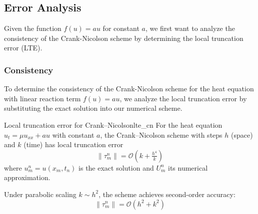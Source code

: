 
\subsection{Error Analysis}
Given the function \(f(u) = au\) for constant \(a\), we first want to analyze the consistency of the Crank-Nicolson scheme by determining the local truncation error (LTE).

\subsubsection{Consistency}
To determine the consistency of the Crank-Nicolson scheme for the heat equation with linear reaction term $f(u) = au$, we analyze the local truncation error by substituting the exact solution into our numerical scheme.

\begin{theorem}{Local truncation error for Crank--Nicolson}{lte_cn}
  For the heat equation $u_t = \mu u_{xx} + au$ with constant $a$, the Crank--Nicolson scheme with steps $h$ (space) and $k$ (time) has local truncation error
  \[
    \|\tau_m^n\| = \mathcal{O}\!\left(k +\tfrac{h^4}{k}\right)
  \]
  where $u_m^n = u(x_m,t_n)$ is the exact solution and $U_m^n$ its numerical approximation.

  Under parabolic scaling $k \sim h^2$, the scheme achieves second-order accuracy:
  \[
    \|\tau_m^n\| = \mathcal{O}\!\left(h^2 + k^2\right)
  \]
\end{theorem}

